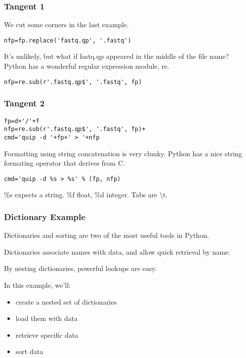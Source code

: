 \documentclass[10pt]{beamer}
\begin{document}
\begin{frame}[fragile]
\frametitle{Tangent 1}

We cut some corners in the last example. 
\vspace{5mm}

\verb+nfp=fp.replace('fastq.qp', '.fastq')+

\vspace{5mm}
It's unlikely, but what if fastq.qp appeared in the middle of the file name?\\
Python has a wonderful regular expression module, re.

\vspace{5mm}
\verb+nfp=re.sub(r'.fastq.qp$', '.fastq', fp)+

\end{frame}

\begin{frame}[fragile]
\frametitle{Tangent 2}

\begin{verbatim}
fp=d+'/'+f
nfp=re.sub(r'.fastq.qp$', '.fastq', fp)+
cmd='quip -d '+fp+' > '+nfp
\end{verbatim}

Formatting using string concatenation is very clunky.  Python has a 
nice string formating operator that derives from C.

\begin{verbatim}
cmd='quip -d %s > %s' % (fp, nfp)
\end{verbatim}

\%s expects a string. \%f float, \%d integer.  Tabs are \textbackslash t.

\end{frame}

\begin{frame}[fragile]
\frametitle{Dictionary Example}

Dictionaries and sorting are two of the most useful tools in Python.  
\vspace{2mm}

Dictionaries associate names with data, and allow quick retrieval by name.
\vspace{2mm}

By nesting dictionaries, powerful lookups are easy.
\vspace{2mm}

In this example, we'll:

\begin{itemize}
\item create a nested set of dictionaries
\item load them with data
\item retrieve specific data
\item sort data
\end{itemize}

\end{frame}
\end{document}
